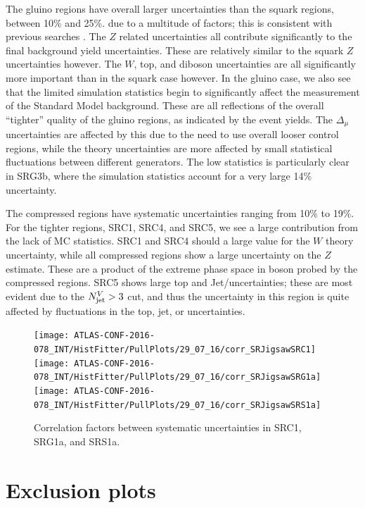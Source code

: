 The gluino regions have overall larger uncertainties than the squark regions, between 10\% and 25\%. due to a multitude of factors; this is consistent with previous searches .
The $Z$ related uncertainties all contribute significantly to the final background yield uncertainties.
These are relatively similar to the squark $Z$ uncertainties however.
The $W$, top, and diboson uncertainties are all significantly more important than in the squark case however.
In the gluino case, we also see that the limited simulation statistics begin to significantly affect the measurement of the Standard Model background.
These are all reflections of the overall ``tighter'' quality of the gluino regions, as indicated by the event yields.
The $\Delta_{\mu}$ uncertainties are affected by this due to the need to use overall looser control regions, while the theory uncertainties are more affected by small statistical fluctuations between different generators.
The low statistics is particularly clear in SRG3b, where the simulation statistics account for a very large 14\% uncertainty.

The compressed regions have systematic uncertainties ranging from 10\% to 19\%.
For the tighter regions, SRC1, SRC4, and SRC5, we see a large contribution from the lack of MC statistics.
SRC1 and SRC4 should a large value for the $W$ theory uncertainty, while all compressed regions show a large uncertainty on the $Z$ estimate.
These are a product of the extreme phase space in boson \pt probed by the compressed regions.
SRC5 shows large top and Jet/\met uncertainties; these are most evident due to the $N_{\text{jet}}^V > 3$ cut, and thus the uncertainty in this region is quite affected by fluctuations in the top, jet, or \met uncertainties.

\begin{figure}[tbph]
\centering
\caption{Correlation factors between systematic uncertainties in SRC1, SRG1a, and SRS1a.} \label{fig:systematic_correlations}
\texttt{[image: ATLAS-CONF-2016-078\_INT/HistFitter/PullPlots/29\_07\_16/corr\_SRJigsawSRC1]}
\texttt{[image: ATLAS-CONF-2016-078\_INT/HistFitter/PullPlots/29\_07\_16/corr\_SRJigsawSRG1a]}
\texttt{[image: ATLAS-CONF-2016-078\_INT/HistFitter/PullPlots/29\_07\_16/corr\_SRJigsawSRS1a]}
\end{figure}



\section{Exclusion plots}


